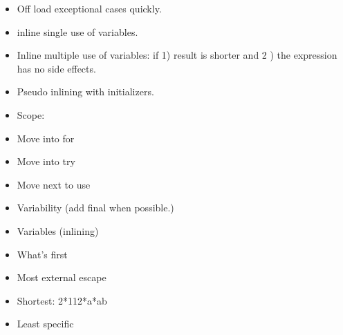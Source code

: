 \begin{itemize}
  \item Off load exceptional cases quickly.
  \item inline single use of variables.
  \item Inline multiple use of variables: if 1) result is shorter and 2
) the expression has no side effects.
  \item Pseudo inlining with initializers.
  \item Scope:
\end{itemize}
\begin{itemize}
 \item Move into for
 \item Move into try
 \item Move next to use
\end{itemize}
\begin{itemize}
\item Variability (add final when possible.)
\item Variables (inlining)
\item What’s first
\end{itemize}
\begin{itemize}
 \item Most external escape
 \item Shortest: 2*112*a*ab
 \item Least specific
\end{itemize}
